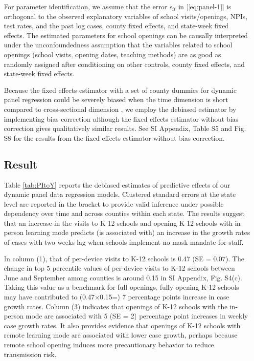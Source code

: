 \documentclass[9pt,twocolumn,twoside,lineno]{pnas-new}
\begin{document}
For parameter identification, we assume that the error $\epsilon_{it}$ in [\ref{eq:panel-1}] is orthogonal to the observed explanatory variables of school visits/openings, NPIs, test rates, and the past log cases, county fixed effects, and state-week fixed effects. The estimated parameters for school openings can be causally interpreted under the unconfoundedness assumption that the variables related to school openings (school visits, opening dates, teaching methods) are as good as randomly assigned after conditioning on other controls, county fixed effects, and state-week fixed effects.

Because the fixed effects estimator with a set of county dummies for dynamic panel regression could be severely biased when the time dimension is short compared to cross-sectional dimension \citep{Nickell1981}, we employ the debiased estimator by implementing bias correction  \citep[e.g.,][]{chen2019mastering} although the fixed effects estimator without bias correction gives qualitatively similar results. See SI Appendix, Table S5 and  Fig. S8 for the results from the fixed effects estimator without bias correction.

 \subsection*{Result}
Table \ref{tab:PItoY}  reports the debiased estimates of predictive effects of our dynamic panel data regression models.  Clustered standard errors at the state level are reported in the bracket to provide valid inference under possible dependency over time and across counties within each state.
The results suggest that an increase in the visits to K-12 schools and opening K-12 schools with in-person learning mode predicts (is associated with) an increase in the growth rates of cases with two weeks lag when schools implement no mask mandate for staff.

In column (1),  that of per-device visits to K-12 schools is 0.47 (SE = 0.07).  The change in top 5 percentile values of per-device visits to  K-12 schools between June and September among counties is around 0.15 in SI Appendix, Fig. S4(c). Taking this value as a benchmark for full openings,  fully opening K-12 schools may have contributed to (0.47$\times$0.15=) 7 percentage points increase in case growth rates. Column (3) indicates that openings of K-12 schools with the in-person mode are associated with 5 (SE = 2) percentage point increases in weekly case growth rates. It also provides evidence that openings of K-12 schools with remote learning mode are associated with lower case growth, perhaps because remote school opening induces more precautionary behavior to reduce transmission risk.
\end{document}
